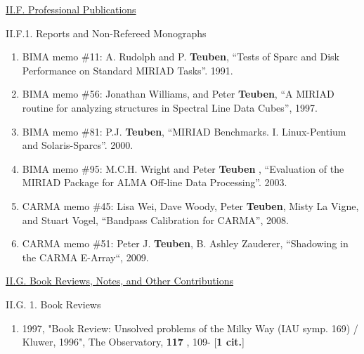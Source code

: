 \documentclass[11pt,letterpaper]{article}
\begin{document}
\underline{II.F. Professional Publications}

II.F.1. Reports and Non-Refereed Monographs


\begin{enumerate}[resume,label=\textbf{\arabic*}.]  
\item
BIMA memo \#11: A. Rudolph and P. {\bf Teuben},
``Tests of Sparc and Disk Performance on Standard MIRIAD Tasks''. 1991.

\item
BIMA memo \#56: Jonathan Williams, and Peter {\bf Teuben},
``A MIRIAD routine for analyzing structures in Spectral Line Data Cubes'', 1997.

\item
BIMA memo \#81: P.J. {\bf Teuben},
``MIRIAD Benchmarks. I. Linux-Pentium and Solaris-Sparcs''. 2000.

\item
BIMA memo \#95: M.C.H. Wright and Peter {\bf Teuben} ,
``Evaluation of the MIRIAD Package for ALMA Off-line Data Processing''. 2003.

\item
CARMA memo \#45:  Lisa Wei, Dave Woody, Peter {\bf Teuben}, Misty La Vigne, and Stuart Vogel,
``Bandpass Calibration for CARMA'', 2008.

\item
CARMA memo \#51: Peter J. {\bf Teuben}, B. Ashley Zauderer,
``Shadowing in the CARMA E-Array``, 2009.
\end{enumerate}
               





\underline{II.G. Book Reviews, Notes, and Other Contributions}

II.G. 1. Book Reviews

\begin{enumerate}[resume,label=\textbf{\arabic*}.]

\item  
 1997,  "Book Review: Unsolved problems of the Milky Way (IAU symp. 169) / 
Kluwer, 1996", The Observatory,  {\bf 117} , 109- [{\bf 1 cit.}] 

\end{enumerate}



\end{document}
